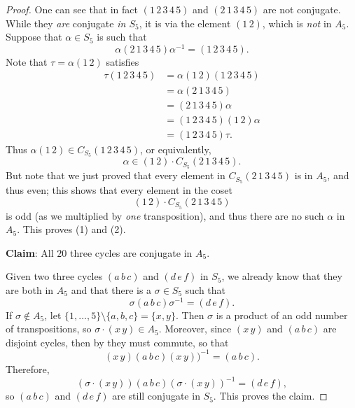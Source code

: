 \documentclass[12pt]{report}
\numberwithin{equation}{section}
\numberwithin{theorem}{chapter}
\theoremstyle{definition}
\newtheorem*{basic properties}{Basic Properties}
\newtheorem*{Important Remark}{Important Remark}
\begin{document}
\begin{proof}
One can see that in fact $(1 \, 2 \, 3 \, 4 \, 5)$ and $(2 \, 1 \, 3 \, 4 \, 5)$ are not conjugate.
While they {\em are} conjugate {\em in $S_5$}, it is via the element $(1 \,2)$, which is {\em not} in $A_5$.
Suppose that $\alpha \in S_5$ is such that
$$\alpha (2 \, 1 \, 3 \, 4 \, 5) \alpha^{-1} = (1 \, 2 \, 3 \, 4 \, 5).$$
Note that $\tau = \alpha (1 \, 2)$ satisfies
$$\begin{aligned}
\tau (1 \, 2 \, 3 \, 4 \, 5) & =  \alpha (1 \, 2) (1 \, 2 \, 3 \, 4 \, 5) \\
& = \alpha (2 \, 1 \, 3 \, 4 \, 5) \\
& = (2 \, 1 \, 3 \, 4 \, 5) \alpha \\
& = (1 \, 2 \, 3 \, 4 \, 5) (1 \, 2) \alpha \\
& = (1 \, 2 \, 3 \, 4 \, 5) \tau.
\end{aligned}$$
Thus $\alpha (1 \, 2) \in C_{S_5}(1 \, 2 \, 3 \, 4 \, 5)$, or equivalently, 
$$\alpha \in (1 \, 2) \cdot C_{S_5}(2 \, 1 \, 3 \, 4 \, 5).$$
But note that we just proved that every element in $C_{S_5}(2 \, 1 \, 3 \, 4 \, 5)$ is in $A_5$, and thus even; this shows that every element in the coset 
$$(1 \, 2) \cdot C_{S_5}(2 \, 1 \, 3 \, 4 \, 5)$$
is odd (as we multiplied by \emph{one} transposition), and thus there are no such $\alpha$ in $A_5$.
This proves (1) and (2).



\vspace{1.5em}

{\bf Claim}: All $20$ three cycles are conjugate in $A_5$.

\vspace{0.5em}

Given two three cycles $(a \, b \, c)$ and $(d \, e \, f)$ in $S_5$, we already know that they are both in $A_5$ and that there is a $\sigma \in S_5$ such that
$$
\sigma (a \, b \, c) \sigma^{-1}  = (d \, e \, f).
$$
If $\sigma \notin A_5$, let $\{1, \dots, 5\} \setminus \{a,b,c\} = \{ x, y\}$. Then $\sigma$ is a product of an odd number of transpositions, so $\sigma \cdot (x \, y) \in A_5$. Moreover, since $(x \, y)$ and $(a \, b \, c)$ are disjoint cycles, then by  they must commute, so that
$$(x \, y) (a \, b \, c) (x \, y))^{-1} = (a \, b \, c).$$
Therefore,
$$(\sigma \cdot (x \, y)) (a \, b \, c) (\sigma \cdot (x \, y))^{-1}  = (d \, e \, f),$$
so $(a \, b \, c)$ and $(d \, e \, f)$ are still conjugate in $S_5$.
This proves the claim.


\end{proof}
\end{document}
